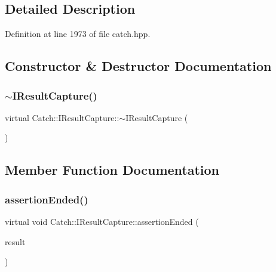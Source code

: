 \subsection{Detailed Description}


Definition at line 1973 of file catch.\+hpp.



\subsection{Constructor \& Destructor Documentation}
\hypertarget{struct_catch_1_1_i_result_capture_a3bd16719d6772b7470887fc36c6d0808}{}\label{struct_catch_1_1_i_result_capture_a3bd16719d6772b7470887fc36c6d0808} 
\subsubsection{\texorpdfstring{$\sim$\+I\+Result\+Capture()}{~IResultCapture()}}
{\footnotesize\ttfamily virtual Catch\+::\+I\+Result\+Capture\+::$\sim$\+I\+Result\+Capture (\begin{DoxyParamCaption}{ }\end{DoxyParamCaption})\hspace{0.3cm}{\ttfamily [virtual]}}



\subsection{Member Function Documentation}
\hypertarget{struct_catch_1_1_i_result_capture_ae45e08bccc5fb434656d4f2e44742223}{}\label{struct_catch_1_1_i_result_capture_ae45e08bccc5fb434656d4f2e44742223} 
\subsubsection{\texorpdfstring{assertion\+Ended()}{assertionEnded()}}
{\footnotesize\ttfamily virtual void Catch\+::\+I\+Result\+Capture\+::assertion\+Ended (\begin{DoxyParamCaption}\item[{\hyperlink{class_catch_1_1_assertion_result}{Assertion\+Result} const \&}]{result }\end{DoxyParamCaption})\hspace{0.3cm}{\ttfamily [pure virtual]}}

